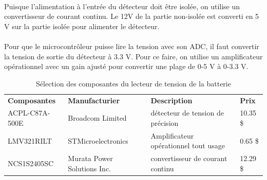 	\paragraph*{}	
	Puisque l'alimentation à l'entrée du détecteur doit être isolée, on utilise un convertisseur de courant continu. Le 12V de la partie non-isolée est converti en 5 V sur la partie isolée pour alimenter le détecteur.
	
	\paragraph*{}	
	Pour que le microcontrôleur puisse lire la tension avec son ADC, il faut convertir la tension de sortie du détecteur à 3.3 V. Pour ce faire, on utilise un amplificateur opérationnel avec un gain ajusté pour convertir une plage de 0-5 V à 0-3.3 V.
	
	\begin{table}[H]
		\centering
		\caption{Sélection des composantes du lecteur de tension de la batterie}
		\label{SelectionSenseVoltageBat}
		\renewcommand{\arraystretch}{1.3}
		\begin{tabular}{|p{3cm}|p{3.5cm}|p{6cm}|p{1.5cm}|}
			\hline
			\textbf{Composantes} & \textbf{Manufacturier} & \textbf{Description} & \textbf{Prix}
			\\ \hhline{|=|=|=|=|}
			ACPL-C87A-500E & Broadcom Limited & détecteur de tension de précision & 10.35 \$	\\ \hline
			LMV321RILT & STMicroelectronics & Amplificateur opérationnel tout usage & 0.65 \$	\\ \hline
			NCS1S2405SC & Murata Power Solutions Inc. & convertisseur de courant continu & 12.29 \$	\\ \hline
		\end{tabular}
	\end{table} 